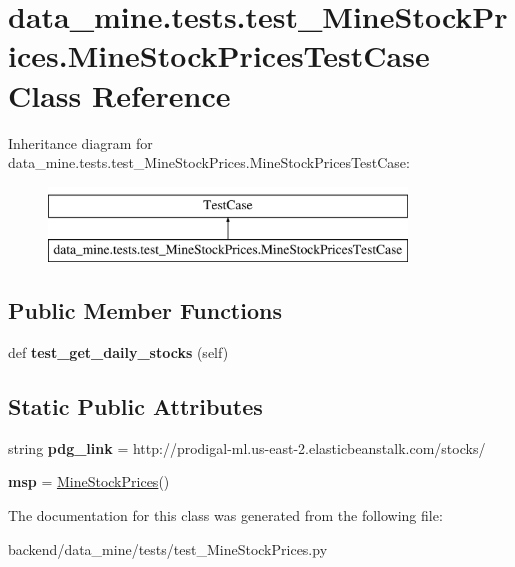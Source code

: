 \hypertarget{classdata__mine_1_1tests_1_1test___mine_stock_prices_1_1_mine_stock_prices_test_case}{}\section{data\+\_\+mine.\+tests.\+test\+\_\+\+Mine\+Stock\+Prices.\+Mine\+Stock\+Prices\+Test\+Case Class Reference}
\label{classdata__mine_1_1tests_1_1test___mine_stock_prices_1_1_mine_stock_prices_test_case}
Inheritance diagram for data\+\_\+mine.\+tests.\+test\+\_\+\+Mine\+Stock\+Prices.\+Mine\+Stock\+Prices\+Test\+Case\+:\begin{figure}[H]
\begin{center}
\leavevmode
\includegraphics[height=2.000000cm]{classdata__mine_1_1tests_1_1test___mine_stock_prices_1_1_mine_stock_prices_test_case}
\end{center}
\end{figure}
\subsection*{Public Member Functions}
\begin{DoxyCompactItemize}
\item 
\mbox{\label{classdata__mine_1_1tests_1_1test___mine_stock_prices_1_1_mine_stock_prices_test_case_aaa403c5596d49b7b948b182b6a626b07}} 
def {\bfseries test\+\_\+get\+\_\+daily\+\_\+stocks} (self)
\end{DoxyCompactItemize}
\subsection*{Static Public Attributes}
\begin{DoxyCompactItemize}
\item 
\mbox{\label{classdata__mine_1_1tests_1_1test___mine_stock_prices_1_1_mine_stock_prices_test_case_a11bf496d00111a6b5f043452294d27cb}} 
string {\bfseries pdg\+\_\+link} = \textquotesingle{}http\+://prodigal-\/ml.\+us-\/east-\/2.elasticbeanstalk.\+com/stocks/\textquotesingle{}
\item 
\mbox{\label{classdata__mine_1_1tests_1_1test___mine_stock_prices_1_1_mine_stock_prices_test_case_abddea13e780cdd2836b5834e8ddc96ba}} 
{\bfseries msp} = \mbox{\hyperlink{classdata__mine_1_1_mine_stock_prices_1_1_mine_stock_prices}{Mine\+Stock\+Prices}}()
\end{DoxyCompactItemize}


The documentation for this class was generated from the following file\+:\begin{DoxyCompactItemize}
\item 
backend/data\+\_\+mine/tests/test\+\_\+\+Mine\+Stock\+Prices.\+py\end{DoxyCompactItemize}
